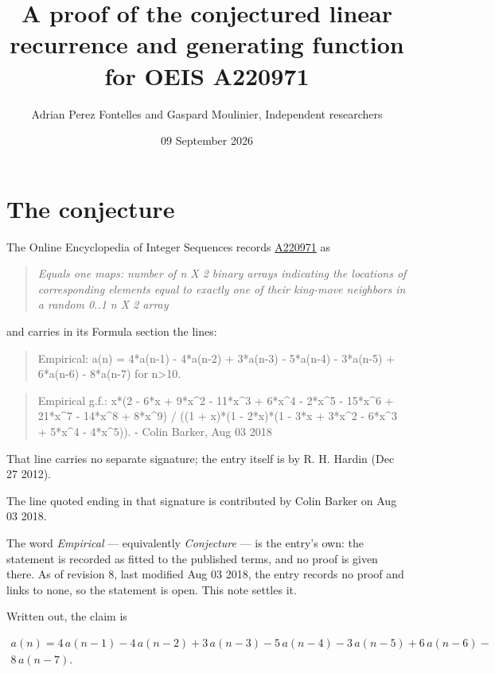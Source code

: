 \documentclass[11pt]{article}
\title{A proof of the conjectured linear recurrence and generating function for OEIS A220971}
\author{Adrian Perez Fontelles and Gaspard Moulinier, Independent researchers}
\date{09 September 2026}
\theoremstyle{definition}
\begin{document}
\maketitle
\section{The conjecture}

The Online Encyclopedia of Integer Sequences records \href{https://oeis.org/A220971}{A220971} as

\begin{quote}\itshape Equals one maps: number of n X 2 binary arrays indicating the locations of corresponding elements equal to exactly one of their king-move neighbors in a random 0..1 n X 2 array\end{quote}

and carries in its Formula section the lines:

\begin{quote}\ttfamily Empirical: a(n) = 4*a(n-1) - 4*a(n-2) + 3*a(n-3) - 5*a(n-4) - 3*a(n-5) + 6*a(n-6) - 8*a(n-7) for n>10.\end{quote}

\begin{quote}\ttfamily Empirical g.f.: x*(2 - 6*x + 9*x\textasciicircum{}2 - 11*x\textasciicircum{}3 + 6*x\textasciicircum{}4 - 2*x\textasciicircum{}5 - 15*x\textasciicircum{}6 + 21*x\textasciicircum{}7 - 14*x\textasciicircum{}8 + 8*x\textasciicircum{}9) / ((1 + x)*(1 - 2*x)*(1 - 3*x + 3*x\textasciicircum{}2 - 6*x\textasciicircum{}3 + 5*x\textasciicircum{}4 - 4*x\textasciicircum{}5)). - Colin Barker, Aug 03 2018\end{quote}

That line carries no separate signature; the entry itself is by R. H. Hardin (Dec 27 2012).

The line quoted ending in that signature is contributed by Colin Barker on Aug 03 2018.

The word {\itshape Empirical} --- equivalently {\itshape Conjecture} --- is the entry's own: the statement is recorded as fitted to the published terms, and no proof is given there. As of revision 8, last modified Aug 03 2018, the entry records no proof and links to none, so the statement is open. This note settles it.

Written out, the claim is

\begin{multline*} a(n) = 4\,a(n-1) - 4\,a(n-2) + 3\,a(n-3) - 5\,a(n-4) - 3\,a(n-5) + 6\,a(n-6) - \\ 8\,a(n-7). \end{multline*}
\end{document}
